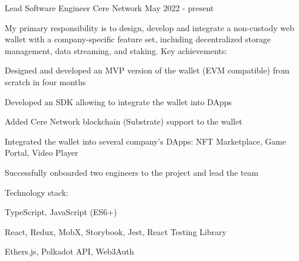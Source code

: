 

\begin{cventries}


  \cventry
    {Lead Software Engineer} %
    {Cere Network} %
    {} %
    {May 2022 - present} %
    {
      My primary responsibility is to design, develop and integrate a non-custody web wallet with a company-specific feature set, including decentralized storage management, data streaming, and staking.
      \newline
      \vspace{2mm}
      Key achievements:
      \vspace{4mm}
      \begin{cvitems}
        \item Designed and developed an MVP version of the wallet (EVM compatible) from scratch in four months
        \item Developed an SDK allowing to integrate the wallet into DApps
        \item Added Cere Network blockchain (Substrate) support to the wallet
        \item Integrated the wallet into several company's DApps: NFT Marketplace, Game Portal, Video Player
        \item Successfully onboarded two engineers to the project and lead the team
      \end{cvitems}
      \vspace{5mm}
      Technology stack:
      \begin{cvstackitems}
        \item TypeScript, JavaScript (ES6+)
        \item React, Redux, MobX, Storybook, Jest, React Testing Library
        \item Ethers.js, Polkadot API, Web3Auth
      \end{cvstackitems}
    }


\end{cventries}
